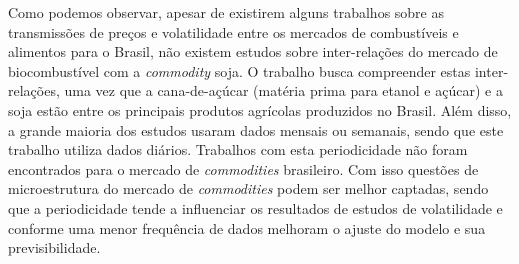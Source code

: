 	Como podemos observar, apesar de existirem alguns trabalhos sobre as transmissões de preços e volatilidade entre os mercados de combustíveis e alimentos para o Brasil, não existem estudos sobre inter-relações do mercado de biocombustível com a \emph{commodity} soja. O trabalho busca compreender estas inter-relações, uma vez que a cana-de-açúcar (matéria prima para etanol e açúcar) e a soja estão entre os principais produtos agrícolas produzidos no Brasil. Além disso, a grande maioria dos estudos usaram dados mensais ou semanais, sendo que este trabalho utiliza dados diários. Trabalhos com esta periodicidade não foram encontrados para o mercado de \emph{commodities} brasileiro. Com isso questões de microestrutura do mercado de \emph{commodities} podem ser melhor captadas, sendo que a periodicidade tende a influenciar os resultados de estudos de volatilidade e conforme  uma menor frequência de dados melhoram o ajuste do modelo e sua previsibilidade.
	
	